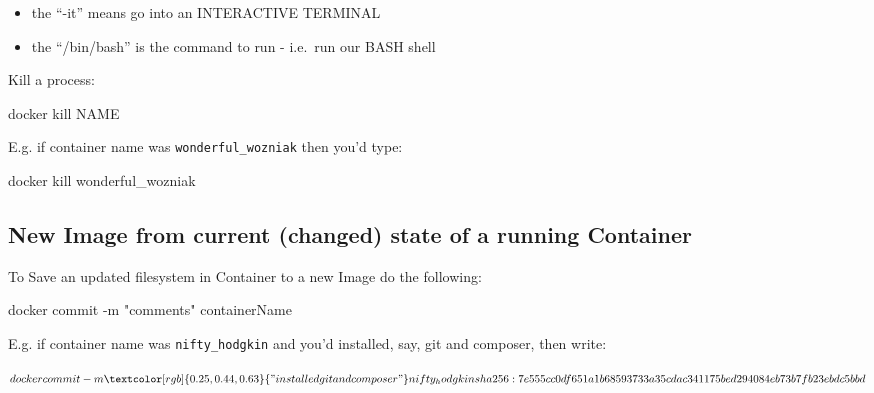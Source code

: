 \documentclass[a4paperpaper,openright]{book}
\newenvironment{Shaded}{}{}
\newcommand{\ExtensionTok}[1]{#1}
\newcommand{\NormalTok}[1]{#1}
\newcommand{\StringTok}[1]{\textcolor[rgb]{0.25,0.44,0.63}{#1}}
\begin{document}
\begin{itemize}
\item
  the ``-it'' means go into an INTERACTIVE TERMINAL
\item
  the ``/bin/bash'' is the command to run - i.e.~run our BASH shell
\end{itemize}

Kill a process:

\begin{Shaded}
\begin{Highlighting}[]
    \ExtensionTok{docker}\NormalTok{ kill NAME}
\end{Highlighting}
\end{Shaded}

E.g. if container name was \texttt{wonderful\_wozniak} then you'd type:

\begin{Shaded}
\begin{Highlighting}[]
    \ExtensionTok{docker}\NormalTok{ kill wonderful_wozniak}
\end{Highlighting}
\end{Shaded}

\hypertarget{new-image-from-current-changed-state-of-a-running-container}{%
\subsection{New Image from current (changed) state of a running
Container}\label{new-image-from-current-changed-state-of-a-running-container}}

To Save an updated filesystem in Container to a new Image do the
following:

\begin{Shaded}
\begin{Highlighting}[]
    \ExtensionTok{docker}\NormalTok{ commit -m }\StringTok{"comments"}\NormalTok{ containerName}
\end{Highlighting}
\end{Shaded}

E.g. if container name was \texttt{nifty\_hodgkin} and you'd installed,
say, git and composer, then write:

\begin{Shaded}
\begin{Highlighting}[]
\NormalTok{    $ }\ExtensionTok{docker}\NormalTok{ commit -m }\StringTok{"installed git and composer"}\NormalTok{ nifty_hodgkin}
    \ExtensionTok{sha256}\NormalTok{:7e555cc0df651a1b68593733a35cdac341175bed294084eb73b7fb23ebdc5bbd}
\NormalTok{    $}
\end{Highlighting}
\end{Shaded}
\end{document}
